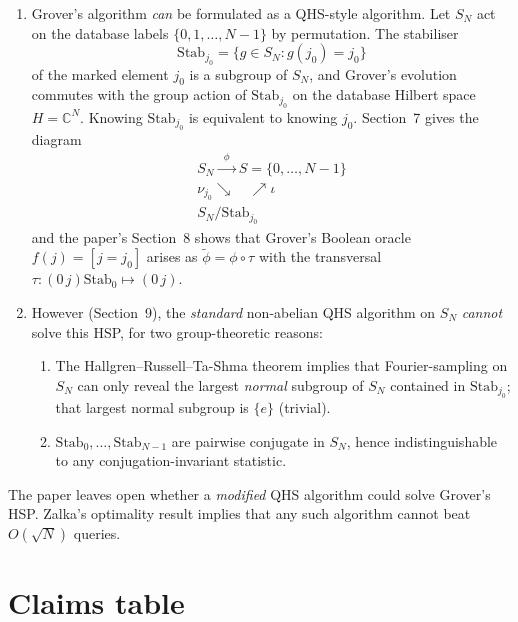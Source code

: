 \documentclass[11pt]{article}
\begin{document}
\begin{enumerate}
\item Grover's algorithm \emph{can} be formulated as a QHS-style algorithm.
Let $S_N$ act on the database labels $\{0,1,\dots,N-1\}$ by permutation.
The stabiliser
\[
\mathrm{Stab}_{j_0}=\{g\in S_N : g(j_0)=j_0\}
\]
of the marked element $j_0$ is a subgroup of $S_N$, and Grover's evolution
commutes with the group action of $\mathrm{Stab}_{j_0}$ on the database
Hilbert space $H=\mathbb{C}^{N}$.  Knowing $\mathrm{Stab}_{j_0}$ is
equivalent to knowing $j_0$.  Section~7 gives the diagram
\[
\begin{array}{c}
S_N \xrightarrow{\;\;\phi\;\;} S=\{0,\dots,N-1\}\\
\nu_{j_0}\searrow\quad\nearrow\iota\\
S_N/\mathrm{Stab}_{j_0}
\end{array}
\]
and the paper's Section~8 shows that Grover's Boolean oracle
$f(j)=[j=j_0]$ arises as $\widetilde\phi=\phi\circ\tau$ with the
transversal $\tau:(0\,j)\mathrm{Stab}_0\mapsto(0\,j)$.

\item However (Section~9), the \emph{standard} non-abelian QHS algorithm
on $S_N$ \emph{cannot} solve this HSP, for two group-theoretic reasons:
\begin{enumerate}
  \item[(i)] The Hallgren--Russell--Ta-Shma theorem \cite{hrt} implies
        that Fourier-sampling on $S_N$ can only reveal the largest
        \emph{normal} subgroup of $S_N$ contained in
        $\mathrm{Stab}_{j_0}$; that largest normal subgroup is
        $\{e\}$ (trivial).
  \item[(ii)] $\mathrm{Stab}_{0},\dots,\mathrm{Stab}_{N-1}$ are
        pairwise conjugate in $S_N$, hence indistinguishable to any
        conjugation-invariant statistic.
\end{enumerate}
\end{enumerate}

The paper leaves open whether a \emph{modified} QHS algorithm could
solve Grover's HSP.  Zalka's optimality result \cite{zalka} implies that
any such algorithm cannot beat $O(\sqrt{N})$ queries.

\section{Claims table}
\end{document}
